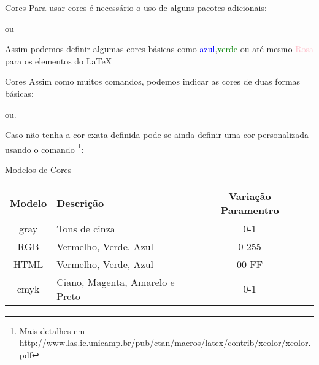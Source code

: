 \begin{frame}{Cores}
Para usar cores é necessário o uso de alguns pacotes adicionais:
\begin{LaTeXcode}
\n
ou\n
{}
\end{LaTeXcode}

Assim podemos definir algumas cores básicas como \textcolor{blue}{azul},\textcolor{green}{verde} ou até mesmo \textcolor{pink}{Rosa} para os elementos do \LaTeX

\end{frame}

\begin{frame}{Cores}
Assim como muitos comandos, podemos indicar as cores de duas formas básicas:

\begin{LaTeXcode}
\n ou\n {}.
\end{LaTeXcode}

Caso não tenha a cor exata definida pode-se ainda definir uma cor personalizada usando o comando \footnote{Mais detalhes em \url{http://www.las.ic.unicamp.br/pub/ctan/macros/latex/contrib/xcolor/xcolor.pdf}}:
\begin{LaTeXcode}
\end{LaTeXcode}
\end{frame}

\begin{frame}{Modelos de Cores}
\begin{block}{}
\begin{tabular}{cp{3cm}cl}
\textbf{Modelo} & \textbf{Descrição} & Variação Paramentro\\
\hline
gray & Tons de cinza & 0-1 \\
RGB & Vermelho, Verde, Azul & 0-255 \\
HTML & Vermelho, Verde, Azul & 00-FF \\
cmyk & Ciano, Magenta, Amarelo e Preto & 0-1 \\
\end{tabular}
\end{block}
\end{frame}

